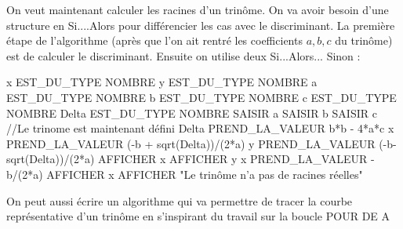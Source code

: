 On veut maintenant calculer les racines d'un trinôme. On va avoir besoin d'une structure en Si....Alors pour différencier les cas avec le discriminant. La première étape de l'algorithme (après que l'on ait rentré les coefficients $a,b,c$ du trinôme) est de calculer le discriminant. Ensuite on utilise deux Si...Alors... Sinon : 
\begin{algobox}
\Variables
\Ligne x EST\_DU\_TYPE NOMBRE
\Ligne y EST\_DU\_TYPE NOMBRE
\Ligne a EST\_DU\_TYPE NOMBRE
\Ligne b EST\_DU\_TYPE NOMBRE
\Ligne c EST\_DU\_TYPE NOMBRE
\Ligne Delta EST\_DU\_TYPE NOMBRE
\DebutAlgo
\Ligne SAISIR a
\Ligne SAISIR b
\Ligne SAISIR c
\Ligne //Le trinome est maintenant défini
\Ligne Delta PREND\_LA\_VALEUR b*b - 4*a*c
\DebutSi
\Ligne x PREND\_LA\_VALEUR (-b + sqrt(Delta))/(2*a)
\Ligne y PREND\_LA\_VALEUR (-b-sqrt(Delta))/(2*a)
\Ligne AFFICHER x
\Ligne AFFICHER y
\FinSi
\Sinon
\DebutSinon
{}
\DebutSi
\Ligne x PREND\_LA\_VALEUR -b/(2*a)
\Ligne AFFICHER x
\FinSi
\Sinon
\DebutSinon
\Ligne AFFICHER "Le trinôme n'a pas de racines réelles"
\FinSinon
\FinSinon
\FinAlgo

\end{algobox}
On peut aussi écrire un algorithme qui va permettre de tracer la courbe représentative d'un trinôme en s'inspirant du travail sur la boucle POUR DE A 

